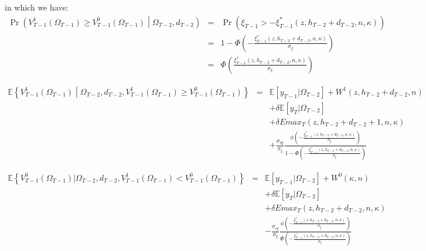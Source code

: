 \noindent in which we have:
\begin{eqnarray*}
\Pr\left(V^1_{T-1}\left(\Omega_{T-1}\right) \geq V^0_{T-1}\left(\Omega_{T-1}\right) \middle| \Omega_{T-2}, d_{T-2} \right) &=& \Pr \left(\xi_{T-1} > -\xi^*_{T-1}\left(z, h_{T-2}+d_{T-2}, n, \kappa \right) \right)\\
&=& 1 - \Phi \left(-\frac{\xi^*_{T-1}\left(z, h_{T-2}+d_{T-2}, n, \kappa \right)}{\sigma_\xi}\right) \\
&=& \Phi \left(\frac{\xi^*_{T-1}\left(z, h_{T-2}+d_{T-2}, n, \kappa \right)}{\sigma_\xi}\right)
\end{eqnarray*}

\begin{eqnarray*}
\mathbb{E} \left\{ V^{1}_{T-1}\left(\Omega_{T-1}\right) \middle| \Omega_{T-2}, d_{T-2}, V^{1}_{T-1}\left(\Omega_{T-1}\right) \geq V^{0}_{T-1}\left(\Omega_{T-1}\right) \right\} &=& \mathbb{E} [y_{T-1} | \Omega_{T-2}] + W^1 \left( z, h_{T-2}+ d_{T-2}, n \right) \\
& & + \delta \mathbb{E} [y_T | \Omega_{T-2}] \\
& & + \delta Emax_T \left( z, h_{T-2} + d_{T-2} +1, n, \kappa \right) \\
& & + \frac{\sigma_{\eta \xi}}{\sigma_\xi} \frac{\phi\left(-\frac{\xi^*_{T-1}\left(z, h_{T-2}+d_{T-2}, n, \kappa \right)}{\sigma_\xi} \right)}{1-\Phi\left( -\frac{\xi^*_{T-1}\left(z, h_{T-2}+d_{T-2}, n, \kappa \right)}{\sigma_\xi}\right)}   
\end{eqnarray*}
 
\begin{eqnarray*}
\mathbb{E} \left\{ V^{0}_{T-1}\left(\Omega_{T-1}\right) | \Omega_{T-2}, d_{T-2}, V^{1}_{T-1}\left(\Omega_{T-1}\right) < V^{0}_{T-1}\left(\Omega_{T-1}\right) \right\}
&=& \mathbb{E} [y_{T-1} | \Omega_{T-2}] + W^0\left(\kappa, n \right) \\
& & +\delta \mathbb{E} [y_T | \Omega_{T-2}] \\
& & + \delta Emax_T \left( z, h_{T-2}+d_{T-2}, n, \kappa \right) \\
& & - \frac{\sigma_{\epsilon \xi}}{\sigma_\xi} \frac{\phi\left(-\frac{\xi^*_{T-1}\left(z, h_{T-2}+d_{T-2},n,\kappa\right)}{\sigma_\xi}\right)}{\Phi\left(-\frac{\xi^*_{T-1}\left(z, h_{T-2}+d_{T-2}, n, \kappa \right)}{\sigma_\xi}\right)}
\end{eqnarray*} 

